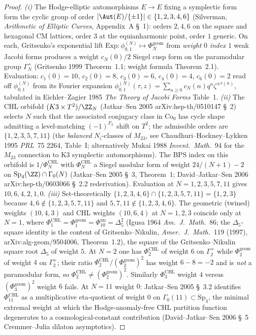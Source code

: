 \begin{proof}
\emph{(i)} The Hodge-elliptic automorphisms $E\to E$ fixing a
symplectic form form the cyclic group of order $|\Aut(E)/\{\pm 1\}|
\in\{1,2,3,4,6\}$ (Silverman, \emph{Arithmetic of Elliptic Curves},
Appendix~A §~1): orders $2,4,6$ on the square and hexagonal CM
lattices, order $3$ at the equianharmonic point, order $1$
generic. On each, Gritsenko's exponential lift
$\mathrm{Exp}:\phi_{0,1}^{(N)}\mapsto\Phi_N^{\mathrm{geom}}$ from
\emph{weight $0$ index $1$} weak Jacobi forms produces a weight
$c_N(0)/2$ Siegel cusp form on the paramodular group $\Gamma_N^+$
(Gritsenko 1999 Theorem~1.1; weight formula
Theorem~2.1). Evaluation: $c_1(0)=10$, $c_2(0)=8$, $c_3(0)=6$,
$c_4(0)=4$, $c_6(0)=2$ read off $\phi_{0,1}^{(N)}$ from its Fourier
expansion $\phi_{0,1}^{(N)}(\tau,z)=\sum_{n\ge 0}
c_N(n)q^n\zeta^{\pm r(n)}$, tabulated in Eichler--Zagier 1985
\emph{The Theory of Jacobi Forms} Table~1.
\emph{(ii)} The CHL orbifold $(K3\times T^2)/\ZZ_N$ (Jatkar--Sen 2005
arXiv:hep-th/0510147 §~2) selects $N$ such that the associated
conjugacy class in $\mathrm{Co}_0$ has cycle shape admitting a
level-matching $(-1)^{F_L}$ shift on $T^2$; the admissible orders are
$\{1,2,3,5,7,11\}$ (the \emph{balanced} $N_i$-classes of $M_{23}$,
see Chaudhuri--Hockney--Lykken 1995 \emph{PRL}~75 2264, Table~I;
alternatively Mukai 1988 \emph{Invent.\ Math.}~94 for the $M_{23}$
connection to K3 symplectic automorphisms). The BPS index on this
orbifold is $1/\Phi_N^{\mathrm{CHL}}$ with
$\Phi_N^{\mathrm{CHL}}$ a Siegel modular form of weight
$24/(N+1)-2$ on $\mathrm{Sp}_4(\ZZ)\cap\Gamma_0(N)$ (Jatkar--Sen
2005 §~3, Theorem~1; David--Jatkar--Sen 2006
arXiv:hep-th/0603066 §~2.2 rederivation). Evaluation at
$N=1,2,3,5,7,11$ gives $10,6,4,2,1,0$.
\emph{(iii)} Set-theoretically
$\{1,2,3,4,6\}\cap\{1,2,3,5,7,11\}=\{1,2,3\}$ because
$4,6\notin\{1,2,3,5,7,11\}$ and $5,7,11\notin\{1,2,3,4,6\}$. The
geometric (twined) weights $(10,4,3)$ and CHL weights $(10,6,4)$ at
$N=1,2,3$ coincide only at $N=1$, where
$\Phi_1^{\mathrm{CHL}}=\Phi_1^{\mathrm{geom}}
=\Phi_{10}^{\mathrm{un}}=\Delta_5^2$ (Igusa 1964
\emph{Am.\ J.\ Math.}~86; the $\Delta_5$-square identity is the
content of Gritsenko--Nikulin, \emph{Amer.\ J.\ Math.}\ 119 (1997),
arXiv:alg-geom/9504006, Theorem~1.2), the square of the
Gritsenko--Nikulin square root $\Delta_5$ of weight $5$. At $N=2$ one has
$\Phi_2^{\mathrm{CHL}}$ of weight $6$ on $\Gamma_2^+$ while
$\Phi_2^{\mathrm{geom}}$ of weight $4$ on $\Gamma_2^+$; their ratio
$\Phi_2^{\mathrm{CHL}}/(\Phi_2^{\mathrm{geom}})^2$ has weight
$6-8=-2$ and is \emph{not} a paramodular form, so
$\Phi_2^{\mathrm{CHL}}\ne(\Phi_2^{\mathrm{geom}})^2$. Similarly
$\Phi_3^{\mathrm{CHL}}$ weight $4$ versus
$(\Phi_3^{\mathrm{geom}})^2$ weight $6$ fails. At $N=11$ weight
$0$: Jatkar--Sen 2005 §~3.2 identifies $\Phi_{11}^{\mathrm{CHL}}$
as a multiplicative eta-quotient of weight $0$ on
$\Gamma_0(11)\subset\mathrm{Sp}_4$, the minimal extremal weight at
which the Hodge-anomaly-free CHL partition function degenerates to a
cosmological-constant contribution (David--Jatkar--Sen 2006 §~5
Cremmer--Julia dilaton asymptotics).
\end{proof}

